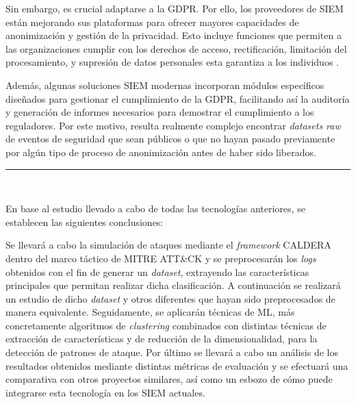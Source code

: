 Sin embargo, es crucial adaptarse a la \gls{GDPR}. Por ello, los proveedores de \gls{SIEM} están mejorando sus plataformas para ofrecer mayores capacidades de anonimización y gestión de la privacidad. Esto incluye funciones que permiten a las organizaciones cumplir con los derechos de acceso, rectificación, limitación del procesamiento, y supresión de datos personales esta garantiza a los individuos \cite{EU_GDPR_2016}. 

Además, algunas soluciones \gls{SIEM} modernas incorporan módulos específicos diseñados para gestionar el cumplimiento de la \gls{GDPR}, facilitando así la auditoría y generación de informes necesarios para demostrar el cumplimiento a los reguladores. Por este motivo, resulta realmente complejo encontrar \textit{datasets raw} de eventos de seguridad que sean públicos o que no hayan pasado previamente por algún tipo de proceso de anonimización antes de haber sido liberados. \\

\vspace{4mm}
\noindent\rule[-1ex]{\textwidth}{0.5pt}\\
\vspace{4mm}

En base al estudio llevado a cabo de todas las tecnologías anteriores, se establecen las siguientes conclusiones:

Se llevará a cabo la simulación de ataques mediante el \textit{framework} \gls{CALDERA} dentro del marco táctico de MITRE \gls{ATT&CK} y se preprocesarán los \textit{logs} obtenidos con el fin de generar un \textit{dataset}, extrayendo las características principales que permitan realizar dicha clasificación. A continuación se realizará un estudio de dicho \textit{dataset} y otros diferentes que hayan sido preprocesados de manera equivalente. Seguidamente, se aplicarán técnicas de \gls{ML}, más concretamente algoritmos de \textit{clustering} combinados con distintas técnicas de extracción de características y de reducción de la dimensionalidad, para la detección de patrones de ataque. Por último se llevará a cabo un análisis de los resultados obtenidos mediante distintas métricas de evaluación y se efectuará una comparativa con otros proyectos similares, así como un esbozo de cómo puede integrarse esta tecnología en los \gls{SIEM} actuales.
